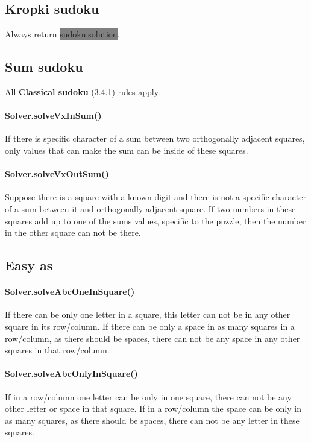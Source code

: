 \documentclass{report}
\begin{document}
\subsection{Kropki sudoku}

Always return \colorbox{gray}{sudoku.solution}.

\subsection{Sum sudoku}

All \textbf{Classical sudoku} (3.4.1) rules apply.

\paragraph{Solver.solveVxInSum()}
If there is specific character of a sum between two orthogonally adjacent squares, only values that can make the sum can be inside of these squares.

\paragraph{Solver.solveVxOutSum()}
Suppose there is a square with a known digit and there is not a specific character of a sum between it and orthogonally adjacent square. If two numbers in these squares add up to one of the sums values, specific to the puzzle, then the number in the other square can not be there.

\subsection{Easy as}

\paragraph{Solver.solveAbcOneInSquare()}
If there can be only one letter in a square, this letter can not be in any other square in its row/column. If there can be only a space in as many squares in a row/column, as there should be spaces, there can not be any space in any other squares in that row/column.

\paragraph{Solver.solveAbcOnlyInSquare()}
If in a row/column one letter can be only in one square, there can not be any other letter or space in that square. If in a row/column the space can be only in as many squares, as there should be spaces, there can not be any letter in these squares.
\end{document}
